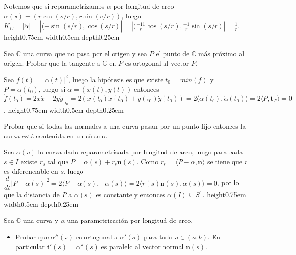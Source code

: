 \documentclass[11pt]{article}
\newcommand{\C}{\mathbb{C}}
\newcommand\abs[1]{\left\lvert#1\right\rvert}
\renewcommand\tt{\mathbf{t}}
\newcommand\nn{\mathbf{n}}
\newenvironment{proof}[1][Demostraci\'on]{\begin{trivlist}
		\item[\hskip \labelsep {\bfseries #1}]}{\end{trivlist}}
\newcommand{\qed}{\nobreak \ifvmode \relax \else
	\ifdim\lastskip<1.5em \hskip-\lastskip
	\hskip1.5em plus0em minus0.5em \fi \nobreak
	\vrule height0.75em width0.5em depth0.25em\fi}
\begin{document}
\begin{enumerate}
\begin{proof}
		Notemos que si reparametrizamos $\alpha$ por longitud de arco $\alpha(s) = (r\cos(s/r) , r \sin(s/r))$, luego $K_C = \abs{\ddot{\alpha}} = \abs{\dot{(-\sin(s/r), \cos(s/r)} }= \abs{(\frac{-11}{r} \cos(s/r), \frac{-1}{r}\sin(s/r)} = \frac{1}{r}$. \qed
		
	\end{proof}
	
	
	\item Sea $\C$ una curva que no pasa por el origen y sea $P$ el punto de $\C$ m\'as pr\'oximo
	al origen. Probar que la tangente a $\C$ en $P$ es ortogonal al vector $P$.
	
	\label{Ejercicio 7}
	
	\begin{proof}
		Sea $f(t) = \abs{\alpha(t)}^2$, luego la hip\'otesis es que existe $t_0 = min (f)$ y $P = \alpha(t_0)$, luego si $\alpha = (x(t) , y(t)) $ entonces $\dot{f}(t_0) = 2x\dot{x} + 2y \dot{y} |_{t_0} = 2(x(t_0)\dot{x}(t_0) + y(t_0)\dot{y}(t_0) ) = 2 \langle \alpha(t_0) , \dot{\alpha}(t_0) \rangle = 2 \langle P , \tt_P \rangle = 0$. \qed
	\end{proof}
	
	\item Probar que si todas las normales a una curva pasan por un punto fijo entonces la
	curva est\'a contenida en un c\'irculo.
	
	\label{Ejercicio 8}
	
	\begin{proof}
		
		Sea $\alpha(s)$ la curva dada reparametrizada por longitud de arco, luego para cada $s \in I$ existe $r_s$ tal que $P = \alpha(s) + r_s \nn(s)$. Como $r_s = \langle P- \alpha  , \nn \rangle$ se tiene que $r$ es diferenciable en $s$, luego $ \dfrac{d}{dt}\abs{P - \alpha(s)}^2 = 2 \langle P- \alpha(s) , -\dot{\alpha} (s) \rangle = 2 \langle r(s) \nn(s) , \dot{\alpha}(s) \rangle = 0$, por lo que la distancia de $P$ a $\alpha(s)$ es constante y entonces $\alpha(I) \subseteq S^1$. \qed
		
	\end{proof}
	
	\item Sea $\C$ una curva y $\alpha$ una
	parametrizaci\'on por longitud de arco.
	
	\begin{itemize}
		\item Probar que $\alpha''(s)$ es ortogonal a $\alpha'(s)$ para todo $s \in (a,b)$. En
		particular $\tt'(s) = \alpha''(s)$ es paralelo al vector normal $\nn(s)$.
		

\end{itemize}
\end{enumerate}
\end{document}
